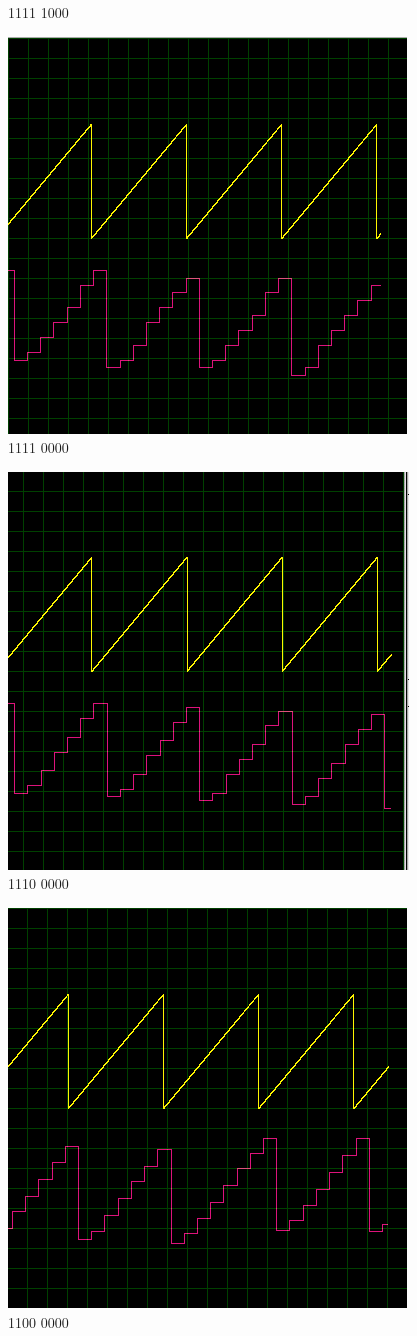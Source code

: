 \begin{multicols}{2}
\begin{figure}[H]
\caption{1111 1000}
\end{figure}
\begin{figure}[H]
\centering
\includegraphics[width=0.5\linewidth]{ImagenesEjercicio1/bit4.png}
\caption{1111 0000}
\end{figure}
\begin{figure}[H]
\centering
\includegraphics[width=0.5\linewidth]{ImagenesEjercicio1/bit5.png}
\caption{1110 0000}
\end{figure}
\begin{figure}[H]
\centering
\includegraphics[width=0.5\linewidth]{ImagenesEjercicio1/bit6.png}
\caption{1100 0000}
\end{figure}

\end{multicols}
